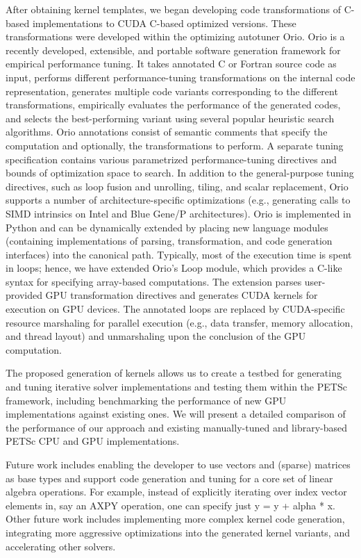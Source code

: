 \documentclass{report}
\begin{document}
After obtaining kernel templates, we began developing code
transformations of C-based implementations to CUDA C-based optimized
versions. These transformations were developed within the optimizing
autotuner Orio. Orio is a recently developed, extensible, and portable
software generation framework for empirical performance tuning. It takes
annotated C or Fortran source code as input, performs different
performance-tuning transformations on the internal code representation,
generates multiple code variants corresponding to the different
transformations, empirically evaluates the performance of the generated
codes, and selects the best-performing variant using several popular
heuristic search algorithms. Orio annotations consist of semantic
comments that specify the computation and optionally, the transformations
to perform. A separate tuning specification contains various parametrized
performance-tuning directives and bounds of optimization space to search.
In addition to the general-purpose tuning directives, such as loop fusion
and unrolling, tiling, and scalar replacement, Orio supports a number of
architecture-specific optimizations (e.g., generating calls to SIMD
intrinsics on Intel and Blue Gene/P architectures). Orio is implemented
in Python and can be dynamically extended by placing new language modules
(containing implementations of parsing, transformation, and code
generation interfaces) into the canonical path. Typically, most of the
execution time is spent in loops; hence, we have extended Orio’s Loop
module, which provides a C-like syntax for specifying array-based
computations. The extension parses user-provided GPU transformation
directives and generates CUDA kernels for execution on GPU devices. The
annotated loops are replaced by CUDA-specific resource marshaling for
parallel execution (e.g., data transfer, memory allocation, and thread
layout) and unmarshaling upon the conclusion of the GPU computation.

The proposed generation of kernels allows us to create a testbed for
generating and tuning iterative solver implementations and testing them
within the PETSc framework, including benchmarking the performance of new
GPU implementations against existing ones. We will present a detailed
comparison of the performance of our approach and existing manually-tuned
and library-based PETSc CPU and GPU implementations.

Future work includes enabling the developer to use vectors and (sparse)
matrices as base types and support code generation and tuning for a core
set of linear algebra operations. For example, instead of explicitly
iterating over index vector elements in, say an AXPY operation, one can
specify just y = y + alpha * x. Other future work includes implementing
more complex kernel code generation, integrating more aggressive
optimizations into the generated kernel variants, and accelerating other
solvers.
\end{document}

